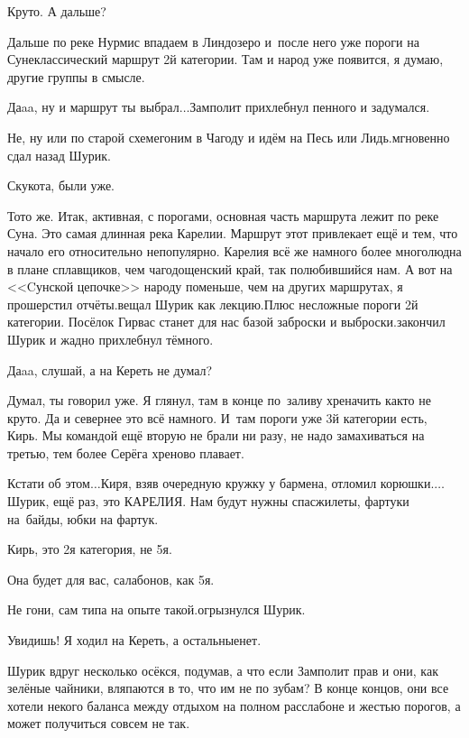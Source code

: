 \diagdash Круто. А дальше? 

\diagdash Дальше по реке Нурмис впадаем в Линдозеро и~после него уже пороги на Суне\mdash классический маршрут 2\sdash й категории. Там и народ уже появится, я думаю, другие группы в смысле.

\diagdash Да\sdash a\sdash a, ну и маршрут ты выбрал$\ldots$\mdash Замполит прихлебнул пенного и задумался.

\diagdash Не, ну или по старой схеме\mdash гоним в Чагоду и идём на Песь или Лидь.\mdash мгновенно сдал назад Шурик.

\diagdash Скукота, были уже.

\diagdash То\sdash то же. Итак, активная, с порогами, основная часть маршрута лежит по реке Суна. Это самая длинная река Карелии. Маршрут этот привлекает ещё и тем, что начало его относительно непопулярно. Карелия всё же намного более многолюдна в плане сплавщиков, чем чагодощенский край, так полюбившийся нам. А вот на <<Cунской цепочке>> народу поменьше, чем на других маршрутах, я прошерстил отчёты.\mdash вещал Шурик как лекцию.\mdash Плюс несложные пороги 2\sdash й категории. Посёлок Гирвас станет для нас базой заброски и выброски.\mdash закончил Шурик и жадно прихлебнул тёмного.

\diagdash Да\sdash a\sdash a, слушай, а на Кереть не думал?

\diagdash Думал, ты говорил уже. Я глянул, там в конце по~заливу хреначить как\sdash то не круто. Да и севернее это всё намного. И~там пороги уже 3\sdash й категории есть, Кирь. Мы командой ещё вторую не брали ни разу, не надо замахиваться на третью, тем более Серёга хреново плавает. 

\diagdash Кстати об этом$\ldots$\mdash Киря, взяв очередную кружку у бармена, отломил корюшки.\mdash $\ldots$Шурик, ещё раз, это КАРЕЛИЯ. Нам будут нужны спасжилеты, фартуки на~байды, юбки на фартук.

\diagdash Кирь, это 2\sdash я категория, не 5\sdash я.

\diagdash Она будет для вас, салабонов, как 5\sdash я.

\diagdash Не гони, сам типа на опыте такой.\mdash огрызнулся Шурик.

\diagdash Увидишь! Я ходил на Кереть, а остальные\mdash нет.

Шурик вдруг несколько осёкся, подумав, а что если Замполит прав и они, как зелёные чайники, вляпаются в то, что им не по зубам? В конце концов, они все хотели некого баланса между отдыхом на полном расслабоне и жестью порогов, а может получиться совсем не так.

